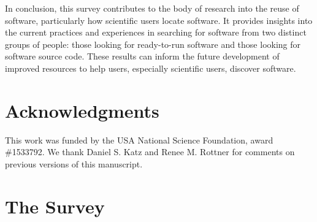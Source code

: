\documentclass{casicswhitepaper}
\begin{document}
In conclusion, this survey contributes to the body of research into the reuse of software, particularly how scientific users locate software.  It provides insights into the current practices and experiences in searching for software from two distinct groups of people: those looking for ready-to-run software and those looking for software source code.  These results can inform the future development of improved resources to help users, especially scientific users, discover software.




\section{Acknowledgments}

This work was funded by the USA National Science Foundation, award \#1533792.  We thank Daniel S. Katz and Renee M. Rottner for comments on previous versions of this manuscript.


\clearpage
\appendix

\section{The Survey}
\label{apdx:survey}
\end{document}
